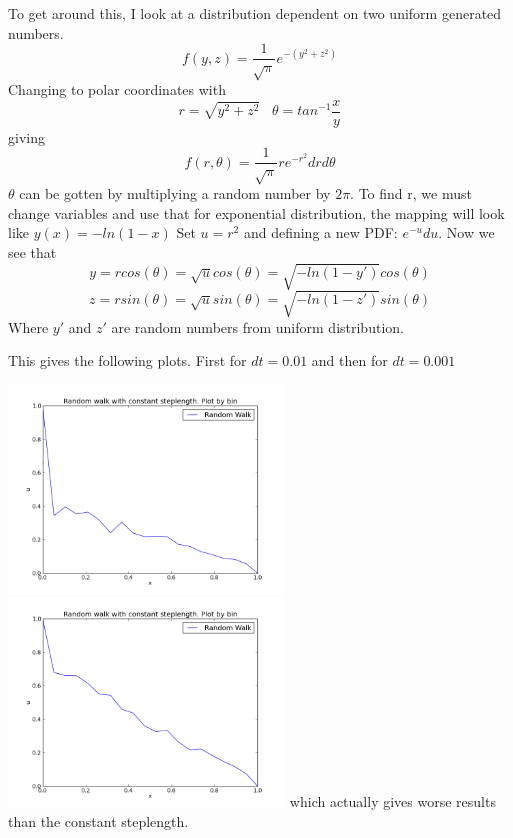 \documentclass[a4paper, 12pt, titlepage]{article}
\newcommand{\f}[2]{\frac{#1}{#2}}
\newcommand{\beq}{\begin{equation*}}
\newcommand{\eeq}{\end{equation*}}
\begin{document}
\begin{section}
\begin{subsection}
  To get around this, I look at a distribution dependent on two uniform generated numbers.
  \beq f(y,z) = \f{1}{\sqrt{\pi}} e^{-(y^2 + z^2)} \eeq 
  Changing to polar coordinates with
  \beq r = \sqrt{y^2 + z^2} \;\;\; \theta = tan^{-1}\f{x}{y} \eeq 
  giving \beq f(r,\theta) = \f{1}{\sqrt{\pi}} r e^{-r^2} drd\theta \eeq 
  $\theta$ can be gotten by multiplying a random number by $2\pi$. To find r, we must change variables and 
  use that for exponential distribution, the mapping will look like $y(x) = -ln(1-x)$
  Set $ u = r^2$ and defining a new PDF: $e^{-u}du$. Now we see that 
  \beq y = rcos(\theta) = \sqrt{u} cos(\theta) = \sqrt{-ln(1-y')}cos(\theta) \eeq
  \beq z = rsin(\theta) = \sqrt{u} sin(\theta) = \sqrt{-ln(1-z')}sin(\theta) \eeq
  Where $y'$ and $z'$ are random numbers from uniform distribution. 
  
  This gives the following plots. First for $dt = 0.01$ and then for $dt = 0.001$
  
  \includegraphics[width=0.55\textwidth]{build-main-Desktop-Debug/MC_normal.png}
  \includegraphics[width=0.55\textwidth]{build-main-Desktop-Debug/MC_normal_low_dt.png}
  which actually gives worse results than the constant steplength. 
  

\end{subsection}
\end{section}
\end{document}
